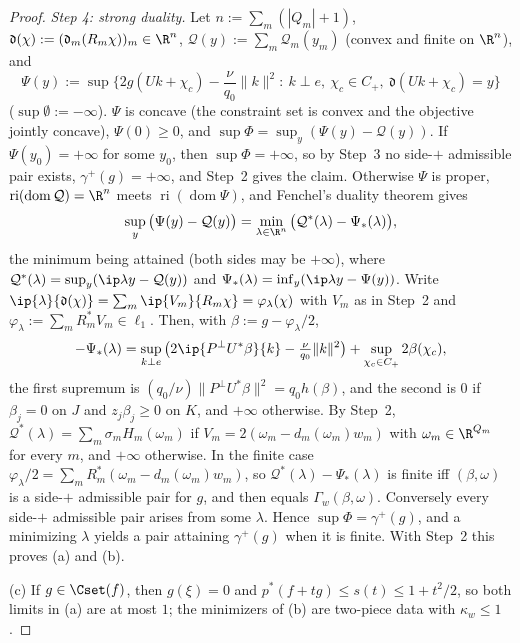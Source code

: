 \begin{proof}
\emph{Step 4: strong duality.}  Let $n:=\sum_m(|Q_m|+1)$,
$\mathfrak d(\chi):=(\mathfrak d_m(R_m\chi))_m\in\R^n$,
$\mathcal Q(y):=\sum_m\mathcal Q_m(y_m)$ (convex and finite on $\R^n$), and
\[
 \Psi(y):=\sup\Big\{2g(Uk+\chi_c)-\frac\nu{q_0}\|k\|^2:\ k\perp e,\ \chi_c\in
 C_+,\ \mathfrak d(Uk+\chi_c)=y\Big\}
\]
($\sup\emptyset:=-\infty$).
$\Psi$ is concave (the constraint set is convex and the objective jointly
concave), $\Psi(0)\ge0$, and $\sup\Phi=\sup_y(\Psi(y)-\mathcal Q(y))$.  If
$\Psi(y_0)=+\infty$ for some $y_0$, then $\sup\Phi=+\infty$, so by Step~3 no
side-$+$ admissible pair exists, $\gamma^+(g)=+\infty$, and Step~2 gives
the claim.  Otherwise $\Psi$ is proper, $\operatorname{ri}(\operatorname{dom}
\mathcal Q)=\R^n$ meets $\operatorname{ri}(\operatorname{dom}\Psi)$, and
Fenchel's duality theorem \cite[Theorem~31.1]{Rockafellar} gives
\[
 \sup_y\big(\Psi(y)-\mathcal Q(y)\big)=\min_{\lambda\in\R^n}\big(\mathcal
 Q^*(\lambda)-\Psi_*(\lambda)\big),
\]
the minimum being attained (both sides may be $+\infty$), where $\mathcal
Q^*(\lambda)=\sup_y(\ip\lambda y-\mathcal Q(y))$ and $\Psi_*(\lambda)=
\inf_y(\ip\lambda y-\Psi(y))$.  Write $\ip{\lambda}{\mathfrak d(\chi)}=
\sum_m\ip{V_m}{R_m\chi}=\varphi_\lambda(\chi)$ with $V_m$ as in Step~2 and
$\varphi_\lambda:=\sum_mR_m^*V_m\in\ell_1$.  Then, with
$\beta:=g-\varphi_\lambda/2$,
\[
 -\Psi_*(\lambda)=\sup_{k\perp e}\big(2\ip{P^\perp U^*\beta}{k}-\tfrac\nu{q_0}
 \|k\|^2\big)+\sup_{\chi_c\in C_+}2\beta(\chi_c),
\]
the first supremum is $(q_0/\nu)\|P^\perp U^*\beta\|^2=q_0h(\beta)$, and the
second is $0$ if $\beta_j=0$ on $J$ and $z_j\beta_j\ge0$ on $K$, and
$+\infty$ otherwise.  By Step~2, $\mathcal Q^*(\lambda)=\sum_m\sigma_m
H_m(\omega_m)$ if $V_m=2(\omega_m-d_m(\omega_m)w_m)$ with $\omega_m\in
\R^{Q_m}$ for every $m$, and $+\infty$ otherwise.  In the finite case
$\varphi_\lambda/2=\sum_mR_m^*(\omega_m-d_m(\omega_m)w_m)$, so
$\mathcal Q^*(\lambda)-\Psi_*(\lambda)$ is finite iff $(\beta,\omega)$ is a
side-$+$ admissible pair for $g$, and then equals $\Gamma_w(\beta,\omega)$.
Conversely every side-$+$ admissible pair arises from some $\lambda$.
Hence $\sup\Phi=\gamma^+(g)$, and a minimizing $\lambda$ yields a pair
attaining $\gamma^+(g)$ when it is finite.  With Step~2 this proves (a)
and (b).

(c) If $g\in\Cset(f)$, then $g(\xi)=0$ and $p^*(f+tg)\le s(t)\le1+t^2/2$, so
both limits in (a) are at most $1$; the minimizers of (b) are two-piece data
with $\kappa_w\le1$.
\end{proof}

